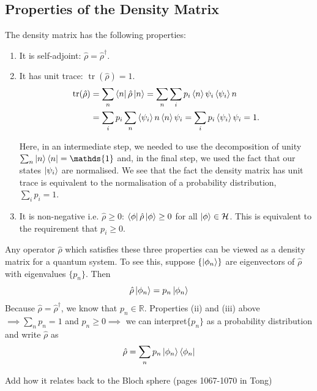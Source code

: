 \documentclass[11pt, answers]{exam}
\theoremstyle{definition}
\theoremstyle{bulleted}
\begin{document}
	\subsection{Properties of the Density Matrix}
	The density matrix has the following properties:
	\begin{enumerate}[label=(\roman*)]
		\item It is self-adjoint: $\hat{\rho} = \hat{\rho}^\dagger$.
		
		\item It has unit trace: $\operatorname{tr}(\hat{\rho}) = 1$.
		\begin{equation*}
			\begin{aligned}
				\operatorname{tr}(\hat{\rho})
				&= \sum_n \bra{n}\hat{\rho}\ket{n}
				= \sum_n \sum_i
				p_i \braket{n}{\psi_i}\braket{\psi_i}{n} \\
				&= \sum_i p_i \sum_n
				\braket{\psi_i}{n}\braket{n}{\psi_i}
				= \sum_i p_i \braket{\psi_i}{\psi_i}
				= 1.
			\end{aligned}
		\end{equation*}
		
		Here, in an intermediate step, we needed to use the
		decomposition of unity
		$\sum_n \ket{n}\bra{n} = \mathds{1}$ and, in the final
		step, we used the fact that our states $\ket{\psi_i}$
		are normalised. We see that the fact the density matrix
		has unit trace is equivalent to the normalisation of
		a probability distribution, $\sum_i p_i = 1$.
		
		\item It is non-negative i.e. $\hat{\rho} \geq 0$:
		$\bra{\phi}\hat{\rho}\ket{\phi} \geq 0$
		for all $\ket{\phi} \in \mathcal{H}$.
		This is equivalent to the requirement
		that $p_i \geq 0$.
	\end{enumerate}
	
	Any operator $\hat{\rho}$ which satisfies these three
	properties can be viewed as a density matrix for a quantum
	system. To see this, suppose $\{\ket{\phi_n}\}$ are eigenvectors of $\hat{\rho}$ with eigenvalues $\{p_n\}$. Then
	\begin{equation*}
		\hat{\rho}\ket{\phi_n} = p_n\ket{\phi_n}
	\end{equation*}
	Because $\hat{\rho} = \hat{\rho}^\dagger$, we know that
	$p_n \in \mathbb{R}$. Properties (ii) and (iii) above $\implies \sum_n p_n = 1$ and $p_n \geq 0\implies$ we can interpret$\{p_n\}$ as a probability
	distribution and write $\hat{\rho}$ as
	\begin{equation*}
		\hat{\rho} = \sum_n p_n\ket{\phi_n}\bra{\phi_n}
	\end{equation*}
	\begin{todo}
		Add how it relates back to the Bloch sphere (pages 1067-1070 in Tong)
	\end{todo}
	
\end{document}

